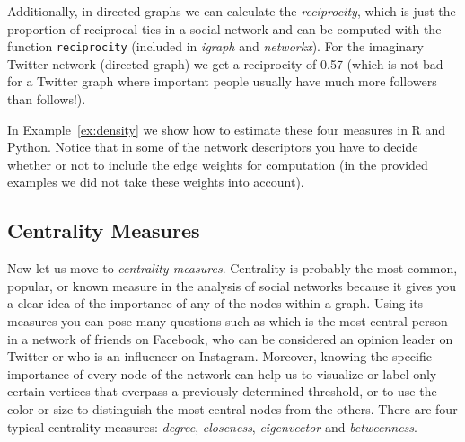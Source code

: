 Additionally, in directed graphs we can calculate the \emph{reciprocity}, which is just the proportion of reciprocal ties in a social network and can be computed with the function \texttt{reciprocity} (included in \emph{igraph} and \emph{networkx}). For the imaginary Twitter network (directed graph) we get a reciprocity of 0.57 (which is not bad for a Twitter graph where important people usually have much more followers than follows!).

In Example~\ref{ex:density} we show how to estimate these four measures in R and Python. Notice that in some of the network descriptors you have to decide whether or not to include the edge weights for computation (in the provided examples we did not take these weights into account).


\subsection{Centrality Measures}\label{sec:centrality}

Now let us move to \emph{centrality measures}. Centrality is probably the most common, popular, or known measure in the analysis of social networks because it gives you a clear idea of the importance of any of the nodes within a graph. Using its measures you can pose many questions such as which is the most central person in a network of friends on Facebook, who can be considered an opinion leader on Twitter or who is an influencer on Instagram. Moreover, knowing the specific importance of every node of the network can help us to visualize or label only certain vertices that overpass a previously determined threshold, or to use the color or size to distinguish the most central nodes from the others. There are four typical centrality measures: \emph{degree}, \emph{closeness}, \emph{eigenvector} and \emph{betweenness}.


